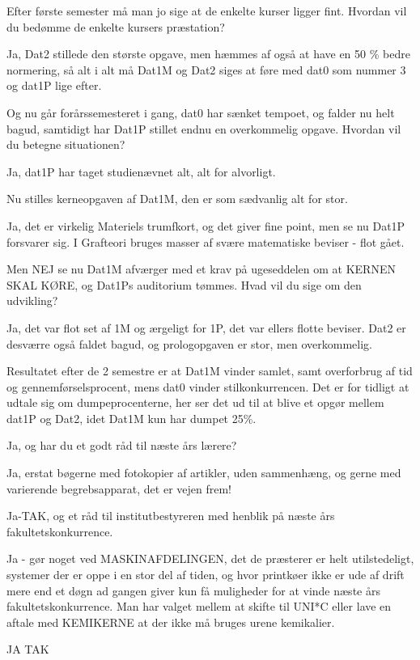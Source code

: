 \documentclass[a4paper,11pt]{article}
\begin{document}
\begin{sketch}
     Efter første semester må man jo sige at de enkelte kurser ligger fint. Hvordan vil du bedømme de enkelte kursers præstation?

     Ja, Dat2 stillede den største opgave, men hæmmes af også at have en 50 \% bedre normering, så alt i alt må Dat1M og Dat2 siges
             at føre med dat0 som nummer 3 og dat1P lige efter.

     Og nu går forårssemesteret i gang, dat0 har sænket tempoet, og falder nu helt bagud, samtidigt har Dat1P stillet endnu en overkommelig
             opgave. Hvordan vil du betegne situationen?

     Ja, dat1P har taget studienævnet alt, alt for alvorligt.

     Nu stilles kerneopgaven af Dat1M, den er som sædvanlig alt for stor.

     Ja, det er virkelig Materiels trumfkort, og det giver fine point, men se nu Dat1P forsvarer sig. I Grafteori bruges masser af
             svære matematiske beviser - flot gået.

     Men NEJ se nu Dat1M afværger med et krav på ugeseddelen om at KERNEN SKAL KØRE, og Dat1Ps auditorium tømmes.
             Hvad vil du sige om den udvikling?

     Ja, det var flot set af 1M og ærgeligt for 1P, det var ellers flotte beviser. Dat2 er desværre også faldet bagud, og prologopgaven
             er stor, men overkommelig.

     Resultatet efter de 2 semestre er at Dat1M vinder samlet, samt overforbrug af tid og gennemførselsprocent, mens dat0
             vinder stilkonkurrencen. Det er for tidligt at udtale sig om dumpeprocenterne, her ser det ud til at blive et opgør mellem
             dat1P og Dat2, idet Dat1M kun har dumpet 25\%.

     Ja, og har du et godt råd til næste års lærere?

     Ja, erstat bøgerne med fotokopier af artikler, uden sammenhæng, og gerne med varierende begrebsapparat, det er vejen frem!

     Ja-TAK, og et råd til institutbestyreren med henblik på næste års fakultetskonkurrence.

     Ja - gør noget ved MASKINAFDELINGEN, det de præsterer er helt utilstedeligt, systemer der er oppe i en stor del af tiden,
             og hvor printkøer ikke er ude af drift mere end et døgn ad gangen giver kun få muligheder for at vinde næste års fakultetskonkurrence.
             Man har valget mellem at skifte til UNI*C eller lave en aftale med KEMIKERNE at der ikke må bruges urene kemikalier.

     JA TAK

\end{sketch}
\end{document}
